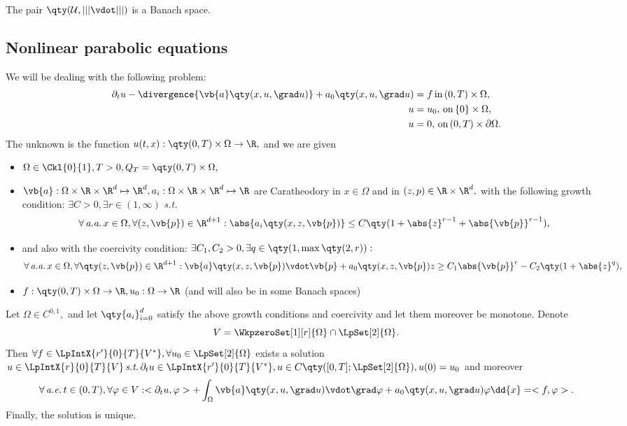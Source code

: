 \begin{remark}
	The pair $\qty(\mathcal{U}, |||\vdot|||)$ is a Banach space.
\end{remark}

\subsection{Nonlinear parabolic equations}
\label{sec:nonlinear_parabolic}

We will be dealing with the following problem:
\begin{align}
	\label{eq:nonlin_parab}
	\partial_t u - \divergence{\vb{a}\qty(x, u, \grad u)}+ a_0\qty(x, u, \grad u) &= f \, \text{in} \, (0,T) \times \Omega, \\
	u &= u_0, \, \text{on} \, \{0\} \times \Omega, \\
	u &= 0, \, \text{on} \, (0,T) \times \partial \Omega.
\end{align}
The unknown is the function $u(t,x): \qty(0,T) \times \Omega \to \R,$ and we are given
\begin{itemize}
	\item $\Omega \in \Ckl{0}{1},T >0, Q_T = \qty(0,T) \times \Omega,$
	\item $\vb{a}:\Omega \times \R \times \R^d \mapsto \R^d, a_i: \Omega \times \R \times \R^d \mapsto \R$ are Caratheodory in $x \in \Omega$ and in $(z, p) \in \R \times \R^d,$ with the following growth condition: $\exists C>0, \exists r\in (1, \infty)$ \textit{s.t.}
		\[
			\forall \, \text{\textit{a.a.}} \, x \in \Omega, \forall (z,\vb{p}) \in \R^{d+1}: \abs{a_i\qty(x, z, \vb{p})} \leq C\qty(1+ \abs{z}^{r-1}+ \abs{\vb{p}}^{r-1}),
		\]
	\item and also with the coercivity condition: $\exists C_1, C_2 >0, \exists q \in \qty(1, \max\qty(2,r)):$
		\[
			\forall \, \text{\textit{a.a.}} \, x \in \Omega, \forall \qty(z, \vb{p}) \in \R^{d+1}: \vb{a}\qty(x,z,\vb{p}) \vdot \vb{p} + a_0\qty(x,z,\vb{p})z \geq C_1\abs{\vb{p}}^r - C_2\qty(1+\abs{z}^q),
		\]
	\item $f: \qty(0,T) \times \Omega \to \R, u_0: \Omega \to \R$ (and will also be in some Banach spaces)

\end{itemize}

\begin{theorem}
	Let $\Omega \in C^{0,1},$ and let  $\qty{a_i}_{i=0}^d$ satisfy the above growth conditions and coercivity and let them moreover be monotone. Denote
	\[
		V = \WkpzeroSet[1][r]{\Omega} \cap \LpSet[2]{\Omega}.
	\]
	Then $\forall f \in \LpIntX{r'}{0}{T}{V^{*}}, \forall u_0 \in \LpSet[2]{\Omega}$ exists  a solution $u \in  \LpIntX{r}{0}{T}{V} \, \text{\textit{s.t.}} \, \partial_t u \in \LpIntX{r'}{0}{T}{V^{*}}, u \in C\qty([0,T]; \LpSet[2]{\Omega}), u(0) = u_0$ and moreover
	\[
		\forall	\, \text{\textit{a.e.}} \,t \in (0,T), \forall \varphi \in V: <\partial_t u, \varphi> + \int_{\Omega}\vb{a}\qty(x, u, \grad u) \vdot \grad \varphi + a_0\qty(x, u, \grad u)\varphi\dd{x} = <f, \varphi>.
	\]
	Finally, the solution is unique.
\end{theorem}

